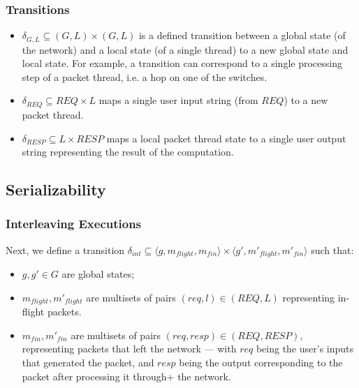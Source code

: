\subsubsection{Transitions}	

\begin{itemize}
	\item 
	$\delta_{G,L} \subseteq (G , L) \times (G , L)$ is a defined transition 
	between a 
	global state (of the network) and a local state (of a single thread) to a 
	new 
	global state and local state.
	For example, a transition can correspond to a single processing step of a 
	packet thread, i.e. a hop on one of the switches. 
	
	\item 
	$\delta_{REQ} \subseteq REQ \times L$ maps a single user input string 
	(from $REQ$) to a new packet thread.
	
	
	\item 
	$\delta_{RESP} \subseteq L \times RESP$ maps a local packet thread state to 
	a 
	single user output string representing the result of the computation.
	
	
\end{itemize}

\subsection{Serializability}




\subsubsection{Interleaving Executions}

Next, we define a transition $\delta_{int} \subseteq \langle 
g,m_{flight},m_{fin} \rangle \times \langle g',m'_{flight},m'_{fin} \rangle $ 
such that:

\begin{itemize}
	
	\item 
	$g,g' \in G$ are global states;
	
	\item
	$m_{flight},m'_{flight}$ are multisets of pairs $(req,l) \in (REQ, 
	L)$ representing in-flight packets. 
	
	\item
	$m_{fin}, m'_{fin}$ are multisets of pairs $(req,resp) \in (REQ, 
	RESP)$, representing packets that left the network --- with $req$ being 
	the user's inputs that generated the packet, and $resp$ 
	being the output corresponding to the packet after processing it through+ 
	the 
	network.
\end{itemize}


